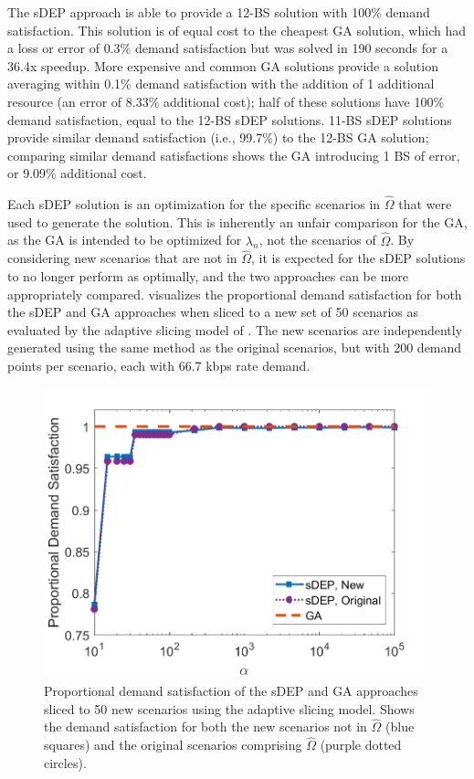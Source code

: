 \documentclass[12pt,dvipsnames]{report}
\begin{document}
The sDEP approach is able to provide a 12-BS solution with 100\% demand satisfaction.  This solution is of equal cost to the cheapest GA solution, which had a loss or error of 0.3\% demand satisfaction but was solved in 190 seconds for a 36.4x speedup.  More expensive and common GA solutions provide a solution averaging within 0.1\% demand satisfaction with the addition of 1 additional resource (an error of 8.33\% additional cost); half of these solutions have 100\% demand satisfaction, equal to the 12-BS sDEP solutions.  11-BS sDEP solutions provide similar demand satisfaction (i.e., 99.7\%) to the 12-BS GA solution; comparing similar demand satisfactions shows the GA introducing 1 BS of error, or 9.09\% additional cost.

Each sDEP solution is an optimization for the specific scenarios in $\hat{\Omega}$ that were used to generate the solution.  This is inherently an unfair comparison for the GA, as the GA is intended to be optimized for $\lambda_n$, not the scenarios of $\hat{\Omega}$.  By considering new scenarios that are not in $\hat{\Omega}$, it is expected for the sDEP solutions to no longer perform as optimally, and the two approaches can be more appropriately compared.   visualizes the proportional demand satisfaction for both the sDEP and GA approaches when sliced to a new set of 50 scenarios as evaluated by the adaptive slicing model of .  The new scenarios are independently generated using the same method as the original scenarios, but with 200 demand points per scenario, each with 66.7 kbps rate demand.

\begin{figure}[htp]
	\centering
	\includegraphics[height=0.4\textheight]{Figures/Prelim_EvalO25_ComparisonSatisfactionFull}
	\caption[Demand satisfaction of the preliminary simulations evaluated against 50 new scenarios]{Proportional demand satisfaction of the sDEP and GA approaches sliced to 50 new scenarios using the adaptive slicing model. Shows the demand satisfaction for both the new scenarios not in $\hat{\Omega}$ (blue squares) and the original scenarios comprising $\hat{\Omega}$ (purple dotted circles).}
	\label{fig:Prelim_VWNCompSatisEval}
\end{figure}
\end{document}
